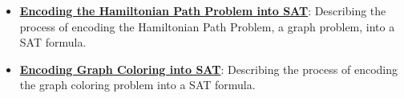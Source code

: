 \documentclass{article}%
\begin{document}
\begin{itemize}[leftmargin=*]
\item \href{https://purdue.brightspace.com/d2l/common/assets/pdfjs-d2l-dist/1.0.14-legacy/web/viewer.html?file=%2Fcontent%2Fenforced%2F1095467-wl.202510.CS.24300.001%2F15L2-SAT.pdf%3Fou%3D1095467&lang=en-us&container=d2l-fileviewer-rendered-pdf&fullscreen=d2l-fileviewer-rendered-pdf-dialog&height=667#page=40}{\textbf{Encoding the Hamiltonian Path Problem into SAT}}: Describing the process of encoding the Hamiltonian Path Problem, a graph problem, into a SAT formula.%
\item \href{https://purdue.brightspace.com/d2l/common/assets/pdfjs-d2l-dist/1.0.14-legacy/web/viewer.html?file=%2Fcontent%2Fenforced%2F1095467-wl.202510.CS.24300.001%2F15L2-SAT.pdf%3Fou%3D1095467&lang=en-us&container=d2l-fileviewer-rendered-pdf&fullscreen=d2l-fileviewer-rendered-pdf-dialog&height=667#page=47}{\textbf{Encoding Graph Coloring into SAT}}: Describing the process of encoding the graph coloring problem into a SAT formula.%
\end{itemize}%
\end{document}
